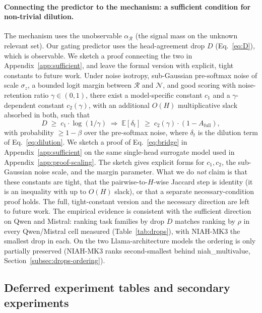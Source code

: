 \paragraph{Connecting the predictor to the mechanism: a sufficient
condition for non-trivial dilution.}
\label{subsec:conjecture}
The mechanism uses the unobservable $\alpha_{\mathcal{R}}$ (the signal
mass on the unknown relevant set). Our gating predictor uses the
head-agreement drop $D$ (Eq.~\eqref{eq:D}), which is observable. We
sketch a proof connecting the two in Appendix~\ref{app:sufficient}, and
leave the formal version with explicit, tight constants to future work.
Under noise isotropy, sub-Gaussian pre-softmax noise of scale
$\sigma_z$, a bounded logit margin between $\mathcal{R}$ and
$\mathcal{N}$, and good scoring with noise-retention ratio $\gamma \in
(0, 1)$, there exist a model-specific constant $c_1$ and a
$\gamma$-dependent constant $c_2(\gamma)$, with an additional $O(H)$
multiplicative slack absorbed in both, such that
\begin{equation}
\label{eq:bridge}
D \;\ge\; c_1 \cdot \log(1/\gamma)
\;\Longrightarrow\;
\mathbb{E}[\delta_t] \;\ge\; c_2(\gamma) \cdot (1 - A_{\mathrm{full}}),
\end{equation}
with probability $\geq 1 - \beta$ over the pre-softmax noise, where
$\delta_t$ is the dilution term of Eq.~\eqref{eq:dilution}.
We sketch a proof of Eq.~\eqref{eq:bridge} in
Appendix~\ref{app:sufficient} on the same single-head surrogate model used
in Appendix~\ref{app:proof-scaling}. The sketch gives explicit forms for
$c_1, c_2$, the sub-Gaussian noise scale, and the margin parameter. What
we do \emph{not} claim is that these constants are tight, that the
pairwise-to-$H$-wise Jaccard step is identity (it is an inequality with
up to $O(H)$ slack), or that a separate necessary-condition proof holds.
The full, tight-constant version and the necessary direction are left to
future work. The empirical evidence is consistent with the sufficient
direction on Qwen and Mistral: ranking task families by drop $D$ matches
ranking by $\rho$ in every Qwen/Mistral cell measured
(Table~\ref{tab:drops}), with NIAH-MK3 the smallest drop in each. On the
two Llama-architecture models the ordering is only partially preserved
(NIAH-MK3 ranks second-smallest behind niah\_multivalue,
Section~\ref{subsec:drops-ordering}).

\subsection{Deferred experiment tables and secondary experiments}

